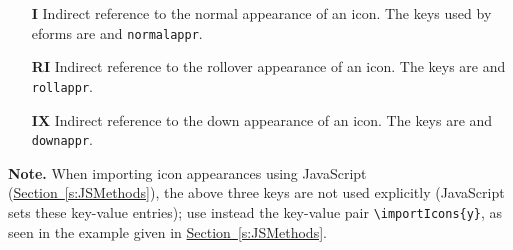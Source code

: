 \documentclass{article}
\begin{document}
\begin{itemize}
  \item [\textbf{I}] Indirect reference to the normal appearance of an icon. The keys
  used by eforms are  and \texttt{normalappr}.
  \item [\textbf{RI}] Indirect reference to the rollover appearance of an icon. The keys
  are  and \texttt{rollappr}.
  \item [\textbf{IX}] Indirect reference to the down appearance of an icon. The keys
  are  and \texttt{downappr}.
\end{itemize}
\textbf{Note.} When importing icon appearances using JavaScript
(\hyperref[s:JSMethods]{Section~\ref*{s:JSMethods}}), the above three keys
are not used explicitly (JavaScript sets these key-value entries); use
instead the key-value pair \verb~\importIcons{y}~, as seen in the example
given in \hyperref[s:JSMethods]{Section~\ref*{s:JSMethods}}.
\end{document}
